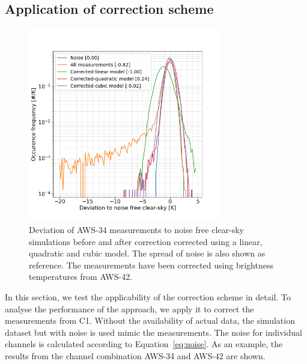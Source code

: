 \documentclass[12pt]{article}
\begin{document}
\subsection{Application of correction scheme}
\begin{figure}[!th]
	\centering
	\includegraphics[clip,trim=0 0 0 0,height=85mm]{PDF_corrected_AWS-34_AWS-42}
	\caption{Deviation of AWS-34 measurements to noise free clear-sky simulations before and after correction corrected using a linear, quadratic and cubic model. The spread of noise is also shown as reference. The measurements have been corrected using brightness temperatures from AWS-42. }
	\label{fig:correction:c34-42}
\end{figure}
%
In this section, we test the applicability of the correction scheme in detail. To analyse the performance of the approach, we apply it to correct the measurements from C1. Without the availability of actual data, the simulation dataset but with noise is used mimic the measurements. The noise for individual channels is calculated according to Equation~\ref{eq:noise}. As an example, the results from the channel combination AWS-34 and AWS-42 are shown.
\end{document}
